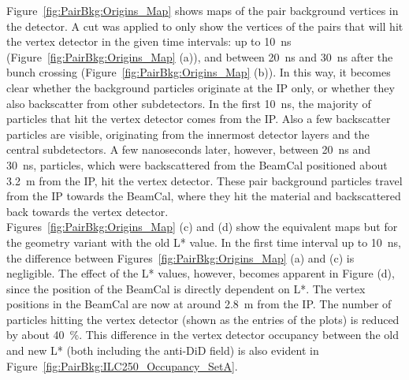 Figure~\ref{fig:PairBkg:Origins_Map} shows maps of the pair background vertices in the \sid detector.
A cut was applied to only show the vertices of the pairs that will hit the vertex detector in the given time intervals: up to \SI{10}{\nano\second} (Figure~\ref{fig:PairBkg:Origins_Map} (a)), and between \SI{20}{\nano\second} and \SI{30}{\nano\second} after the bunch crossing (Figure~\ref{fig:PairBkg:Origins_Map} (b)).
In this way, it becomes clear whether the background particles originate at the IP only, or whether they also backscatter from other subdetectors.
In the first \SI{10}{\nano\second}, the majority of particles that hit the vertex detector comes from the IP.
Also a few backscatter particles are visible, originating from the innermost detector layers and the central subdetectors.
A few nanoseconds later, however, between \SI{20}{\nano\second} and \SI{30}{\nano\second}, particles, which were backscattered from the BeamCal positioned about \SI{3.2}{\meter} from the IP, hit the vertex detector.
These pair background particles travel from the IP towards the BeamCal, where they hit the material and backscattered back towards the vertex detector.
\\Figures~\ref{fig:PairBkg:Origins_Map} (c) and (d) show the equivalent maps but for the \sid geometry variant with the old L* value.
In the first time interval up to \SI{10}{\nano\second}, the difference between Figures~\ref{fig:PairBkg:Origins_Map} (a) and (c) is negligible.
The effect of the L* values, however, becomes apparent in Figure (d), since the position of the BeamCal is directly dependent on L*.
The vertex positions in the BeamCal are now at around \SI{2.8}{\meter} from the IP.
The number of particles hitting the vertex detector (shown as the entries of the plots) is reduced by about \SI{40}{\percent}.
This difference in the vertex detector occupancy between the old and new L* (both including the anti-DiD field) is also evident in Figure~\ref{fig:PairBkg:ILC250_Occupancy_SetA}.

